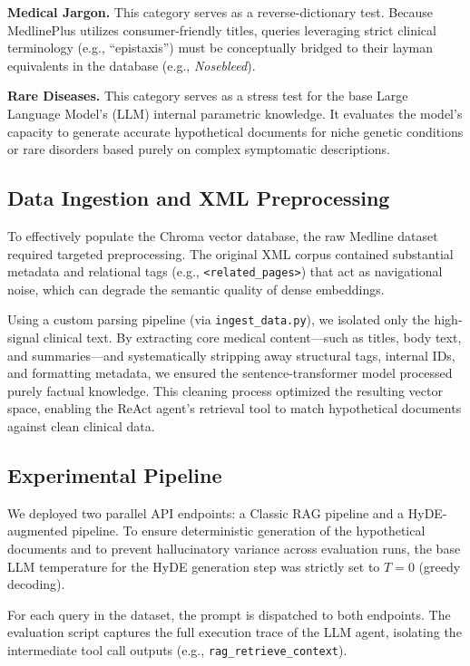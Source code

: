 \noindent\textbf{Medical Jargon.} This category serves as a reverse-dictionary test. Because MedlinePlus utilizes consumer-friendly titles, queries leveraging strict clinical terminology (e.g., ``epistaxis'') must be conceptually bridged to their layman equivalents in the database (e.g., \textit{Nosebleed}).

\noindent\textbf{Rare Diseases.} This category serves as a stress test for the base Large Language Model's (LLM) internal parametric knowledge. It evaluates the model's capacity to generate accurate hypothetical documents for niche genetic conditions or rare disorders based purely on complex symptomatic descriptions.

\subsection{Data Ingestion and XML Preprocessing}

To effectively populate the Chroma vector database, the raw Medline dataset required targeted preprocessing. The original XML corpus contained substantial metadata and relational tags (e.g., \texttt{<related\_pages>}) that act as navigational noise, which can degrade the semantic quality of dense embeddings.

Using a custom parsing pipeline (via \texttt{ingest\_data.py}), we isolated only the high-signal clinical text. By extracting core medical content---such as titles, body text, and summaries---and systematically stripping away structural tags, internal IDs, and formatting metadata, we ensured the sentence-transformer model processed purely factual knowledge. This cleaning process optimized the resulting vector space, enabling the ReAct agent's retrieval tool to match hypothetical documents against clean clinical data.

\subsection{Experimental Pipeline}
We deployed two parallel API endpoints: a Classic RAG pipeline and a HyDE-augmented pipeline. To ensure deterministic generation of the hypothetical documents and to prevent hallucinatory variance across evaluation runs, the base LLM temperature for the HyDE generation step was strictly set to $T=0$ (greedy decoding).

For each query in the dataset, the prompt is dispatched to both endpoints. The evaluation script captures the full execution trace of the LLM agent, isolating the intermediate tool call outputs (e.g., \texttt{rag\_retrieve\_context}).

